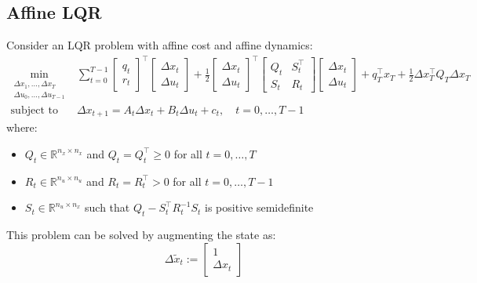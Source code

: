 \documentclass[openany]{book}
\theoremstyle{definition}
\theoremstyle{remark}
\begin{document}
\subsection{Affine LQR}
Consider an LQR problem with affine cost and affine dynamics:
\begin{align*}
    \min_{\substack{\Delta x_1,\ldots,\Delta x_T\\\Delta u_0,\ldots,\Delta u_{T-1}}} &\sum_{t=0}^{T-1} \begin{bmatrix}
        q_t \\ r_t
    \end{bmatrix}^\top \begin{bmatrix}
        \Delta x_t \\ \Delta u_t
    \end{bmatrix} + \frac{1}{2}\begin{bmatrix}
        \Delta x_t \\ \Delta u_t
    \end{bmatrix}^\top \begin{bmatrix}
        Q_t & S_t^\top \\ S_t & R_t
    \end{bmatrix}\begin{bmatrix}
        \Delta x_t \\ \Delta u_t
    \end{bmatrix} + q_T^\top x_T + \frac{1}{2}\Delta x_T^\top Q_T\Delta x_T\\
    \text{subject to } &\Delta x_{t+1} = A_t\Delta x_t + B_t\Delta u_t + c_t, \quad t = 0,\ldots,T-1
\end{align*}
where:
\begin{itemize}
    \item $Q_t \in \mathbb{R}^{n_x \times n_x}$ and $Q_t = Q_t^\top \geq 0$ for all $t = 0,\ldots,T$
    \item $R_t \in \mathbb{R}^{n_u \times n_u}$ and $R_t = R_t^\top > 0$ for all $t = 0,\ldots,T-1$
    \item $S_t \in \mathbb{R}^{n_u \times n_x}$ such that $Q_t - S_t^\top R_t^{-1}S_t$ is positive semidefinite
\end{itemize}

This problem can be solved by augmenting the state as:
\[
    \Delta \tilde{x}_t := \begin{bmatrix} 1 \\ \Delta x_t \end{bmatrix}
\]
\end{document}
